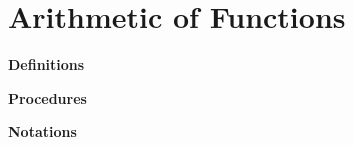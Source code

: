 \chapter{Arithmetic of Functions}
\begin{genericFrame}[frametitle={~New Things\hbox{~}}]
    \textbf{\Large\sffamily Definitions}

    \noindent\textbf{\Large\sffamily Procedures}

    \noindent\textbf{\Large\sffamily Notations}
\end{genericFrame}
